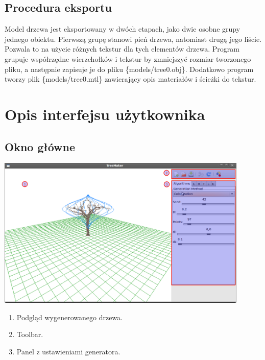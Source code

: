 \subsection{Procedura eksportu}
Model drzewa jest eksportowany w dwóch etapach, jako dwie osobne grupy jednego obiektu. Pierwszą grupę stanowi pień drzewa, natomiast drugą jego liście.
Pozwala to na użycie różnych tekstur dla tych elementów drzewa. Program grupuje współrzędne wierzchołków i tekstur by zmniejszyć rozmiar tworzonego pliku, a następnie
zapisuje je do pliku \{models/tree0.obj\}. Dodatkowo program tworzy plik \{models/tree0.mtl\} zawierający opis materiałów i ścieżki do tekstur. 
\section{Opis interfejsu użytkownika}

\subsection{Okno główne}
\includegraphics[width=120mm]{images/gui/main_window.png}
\begin{enumerate}
	\item {Podgląd wygenerowanego drzewa.}
	\item {Toolbar.}
	\item {Panel z ustawieniami generatora.}
\end{enumerate}

